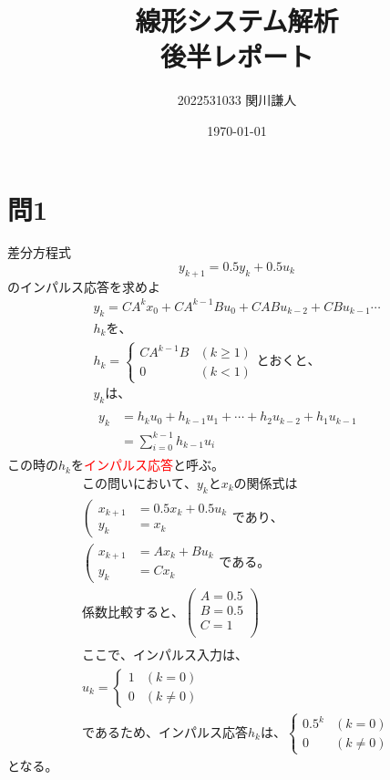 \documentclass[a4paper,11pt]{ltjsarticle}
\begin{document}
\title{線形システム解析\\後半レポート}
\author{2022531033 関川謙人}
\date{\today}
\maketitle
\section*{問1}
差分方程式
\begin{equation*}
  y_{k+1} = 0.5y_{k}+0.5u_{k}
\end{equation*}
のインパルス応答を求めよ
\begin{gather*}
  y_{k} = CA^{k}x_{0}+CA^{k-1}Bu_{0}+CABu_{k-2}+CBu_{k-1}\dotsb \\
  h_{k}を、\\
  h_{k}=
  \begin{cases}
    CA^{k-1}B & (k \geq 1) \\
    0 & (k < 1)
  \end{cases}
  とおくと、\\
  y_{k}は、\\
  \begin{split}
    y_{k} &= h_{k}u_{0}+h_{k-1}u_{1}+\dotsb+h_{2}u_{k-2}+h_{1}u_{k-1}\\
    &= \sum_{i=0}^{k-1}h_{k-1}u_{i}
  \end{split}
\end{gather*}
この時の$h_{k}$を\textcolor{red}{インパルス応答}と呼ぶ。
\begin{gather*}
  この問いにおいて、y_{k}とx_{k}の関係式は\\
  \left(
    \begin{split}
    x_{k+1} &= 0.5x_{k} + 0.5u_{k} \\
    y_{k} &= x_{k}
    \end{split}
  \right.
  であり、\\
  \left(
    \begin{split}
      x_{k+1} &= Ax_{k} + Bu_{k} \\
      y_{k} &= Cx_{k}
    \end{split}
  \right.
  である。
  \\係数比較すると、
  \begin{pmatrix}
    A = 0.5 \\
    B = 0.5 \\
    C = 1 \\
  \end{pmatrix}
  \\
  \\ここで、インパルス入力は、
  \\u_{k}=
  \begin{cases}
    1 & (k = 0) \\
    0 & (k \neq 0)
  \end{cases}
  \\であるため、インパルス応答h_{k}は、
  \begin{cases}
    0.5^{k} & (k = 0) \\
    0 & (k \neq 0)
  \end{cases}
\end{gather*}
となる。
\end{document}
